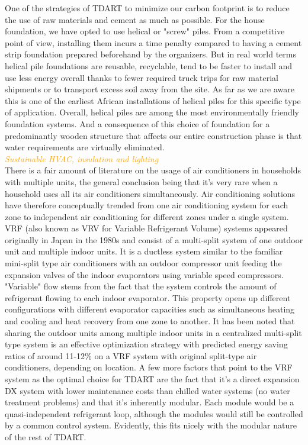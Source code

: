 \documentclass[justified]{tufte-book}
\begin{document}
	One of the strategies of TDART to minimize our carbon footprint is to reduce the use of raw materials and cement as much as possible. For the house foundation, we have opted to use helical or "screw" piles. From a competitive point of view, installing them incurs a time penalty compared to having a cement strip foundation prepared beforehand by the organizers. But in real world terms helical pile foundations are reusable, recyclable, tend to be faster to install and use less energy overall thanks to fewer required truck trips for raw material shipments or to transport excess soil away from the site.  As far as we are aware this is one of the earliest African installations of helical piles for this specific type of application.  Overall, helical piles are among the most environmentally friendly foundation systems\cite{perko2009helical}. And a consequence of this choice of foundation for a predominantly wooden structure that affects our entire construction phase is that water requirements are virtually eliminated. 
		\vspace*{2cm}\\
	\textcolor{orange}{\textit{\Huge{Sustainable HVAC, insulation and lighting}}}
		\vspace*{2cm}\\
	There is a fair amount of literature\cite{jian2011study, ran2011wu, li2014testing}  on the usage of air conditioners in households  with multiple units, the general conclusion being that it's very rare when a household uses all its air conditioners simultaneously.
	Air conditioning solutions have therefore conceptually trended from one air conditioning system for each zone to independent air conditioning for different zones under a single system\cite{park2001performance}. VRF (also known as VRV for Variable Refrigerant Volume) systems appeared originally in Japan in the 1980s and consist of a multi-split system of one outdoor unit and multiple indoor units. It is a ductless system similar to the familiar mini-split type air conditioners with an outdoor compressor unit feeding the expansion valves of the indoor evaporators using variable speed compressors. "Variable" flow stems from the fact that the system controls the amount of refrigerant flowing to each indoor evaporator. This property opens up different configurations with different evaporator capacities such as simultaneous heating and cooling and heat recovery from one zone to another\cite{goetzler2007variable}.
	It has been noted that sharing the outdoor units among multiple indoor units in a centralized multi-split type system is an effective optimization strategy\cite{li2017simulation} with predicted energy saving ratios of around 11-12\% on a VRF system with original split-type air conditioners, depending on location. A few more factors that point to the VRF system as the optimal choice for TDART are the fact that it's a direct expansion DX system with lower maintenance costs than chilled water systems (no water treatment problems) and that it's inherently modular. Each module would be a quasi-independent refrigerant loop, although the modules would still be controlled by a common control system. Evidently, this fits nicely with the modular nature of the rest of TDART.
\end{document}
